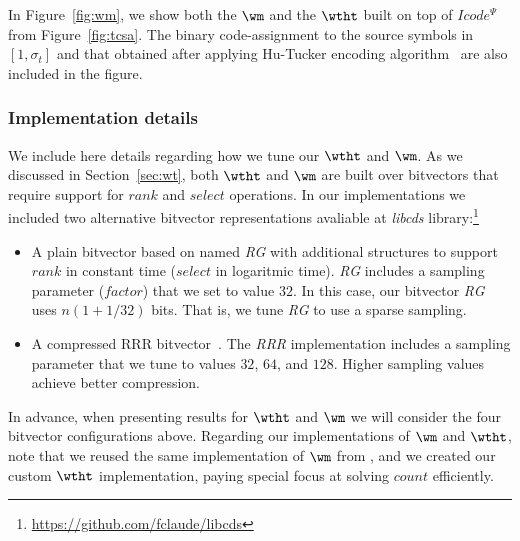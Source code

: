 In Figure~\ref{fig:wm}, we show both the $\wm$ and the $\wtht$ built on top of $Icode^{\Psi}$ from Figure~\ref{fig:tcsa}.
The binary code-assignment to the source symbols in $[1,\sigma_t]$ and that obtained after applying Hu-Tucker encoding
algorithm~\cite{hu1971optimal} are also included in the figure.

\subsubsection{Implementation details} We include here details regarding how we tune our $\wtht$ and $\wm$.
As we discussed in Section~\ref{sec:wt}, both $\wtht$ and $\wm$ are built over bitvectors that require
support for $rank$ and $select$ operations. In our implementations we included two alternative bitvector representations avaliable
at {\em libcds} library:{\footnote{\url{https://github.com/fclaude/libcds}}}


\begin{itemize}
	\item A plain bitvector based on \cite{Mun96} named {\em RG} with 
	additional structures to support $rank$ in constant time ($select$ in logaritmic time).
	{\em RG} includes a sampling parameter ($factor$) that we set to value $32$. In this case,
	our  bitvector {\em RG} uses $n (1+1/32)$ bits. That is, we tune {\em RG} to use a sparse sampling. 
		
	\item A compressed RRR bitvector~\cite{Raman:2002:SID:545381.545411}. The {\em RRR} implementation includes
	a sampling parameter that we tune to values $32$, $64$, and $128$. Higher sampling values achieve better compression.
	
\end{itemize}


In advance, when presenting results for $\wtht$ and $\wm$ we will consider the four bitvector configurations
above. Regarding our implementations of $\wm$ and $\wtht$, note that we reused the same implementation of $\wm$ from \cite{CNO15}, 
and we created our custom $\wtht$ implementation, paying special focus at solving $count$ efficiently. 

